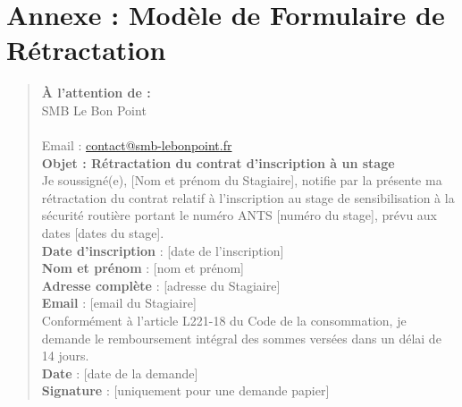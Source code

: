 \documentclass[a4paper,12pt]{article}
\begin{document}
\section*{Annexe : Modèle de Formulaire de Rétractation}
\begin{quote}
    \textbf{À l'attention de :} \\
    SMB Le Bon Point \\
    [Adresse complète, ex. 12 Rue de Paris, 94100 Saint-Maur-des-Fossés] \\
    Email : \href{mailto:contact@smb-lebonpoint.fr}{contact@smb-lebonpoint.fr} \\
    
    \textbf{Objet : Rétractation du contrat d'inscription à un stage} \\
    
    Je soussigné(e), [Nom et prénom du Stagiaire], notifie par la présente ma rétractation du contrat relatif à l'inscription au stage de sensibilisation à la sécurité routière portant le numéro ANTS [numéro du stage], prévu aux dates [dates du stage]. \\
    
    \textbf{Date d'inscription} : [date de l'inscription] \\
    \textbf{Nom et prénom} : [nom et prénom] \\
    \textbf{Adresse complète} : [adresse du Stagiaire] \\
    \textbf{Email} : [email du Stagiaire] \\
    
    Conformément à l'article L221-18 du Code de la consommation, je demande le remboursement intégral des sommes versées dans un délai de 14 jours. \\
    
    \textbf{Date} : [date de la demande] \\
    \textbf{Signature} : [uniquement pour une demande papier]
\end{quote}
\end{document}
